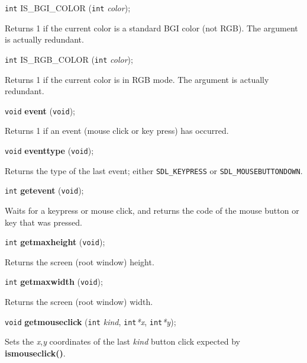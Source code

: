 \documentclass[a4paper,11pt]{article}
\newcommand{\V}{\texttt{void}}      %
\newcommand{\I}{\texttt{int}}       %
\newcommand{\func}[1]{\textbf{#1}}  %
\newcommand{\A}[1]{\emph{#1}}       %
\newcommand{\T}[1]{\texttt{#1}}     %
\newenvironment{bgi}
{ %
  \begin{snugshade}
}
{ %
  \end{snugshade}
}
\begin{document}
\begin{bgi}
\I{} IS\_BGI\_COLOR (\I{} \A{color});
\end{bgi}

Returns 1 if the current color is a standard BGI color (not RGB). The
argument is actually redundant.


\begin{bgi}
\I{} IS\_RGB\_COLOR (\I{} \A{color});
\end{bgi}

Returns 1 if the current color is in RGB mode. The argument is
actually redundant.


\begin{bgi}
\V{} \func{event} (\V{});
\end{bgi}

Returns 1 if an event (mouse click or key press) has occurred.


\begin{bgi}
\V{} \func{eventtype} (\V{});
\end{bgi}

Returns the type of the last event; either \T{SDL\_KEYPRESS} or
\T{SDL\_MOUSEBUTTONDOWN}.


\begin{bgi}
\I{} \func{getevent} (\V{});
\end{bgi}

Waits for a keypress or mouse click, and returns the code of the mouse
button or key that was pressed.


\begin{bgi}
\I{} \func{getmaxheight} (\V{});
\end{bgi}

Returns the screen (root window) height.


\begin{bgi}
\I{} \func{getmaxwidth} (\V{});
\end{bgi}

Returns the screen (root window) width.


\begin{bgi}
\V{} \func{getmouseclick} (\I{} \A{kind}, \I{}\A{*x}, \I{}\A{*y});
\end{bgi}

Sets the \A{x},\A{y} coordinates of the last \A{kind} button click
expected by \func{ismouseclick()}.
\end{document}
